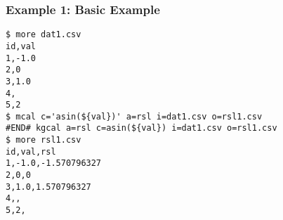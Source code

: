 \subsubsection*{Example 1: Basic Example}



\begin{Verbatim}[baselinestretch=0.7,frame=single]
$ more dat1.csv
id,val
1,-1.0
2,0
3,1.0
4,
5,2
$ mcal c='asin(${val})' a=rsl i=dat1.csv o=rsl1.csv
#END# kgcal a=rsl c=asin(${val}) i=dat1.csv o=rsl1.csv
$ more rsl1.csv
id,val,rsl
1,-1.0,-1.570796327
2,0,0
3,1.0,1.570796327
4,,
5,2,
\end{Verbatim}
